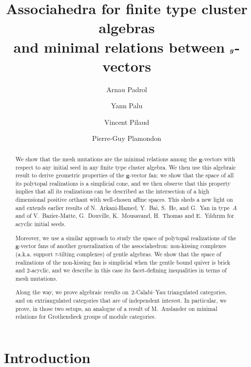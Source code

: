 \documentclass{amsart}
\title[Generalized associahedra and minimal relations between $\b{g}$-vectors]{Associahedra for finite type cluster algebras \\ and minimal relations between $\b{g}$-vectors}
\author{Arnau Padrol}
\author{Yann Palu}
\author{Vincent Pilaud}
\author{Pierre-Guy Plamondon}
\theoremstyle{definition}
\renewcommand{\b}[1]{{\boldsymbol{#1}}} %
\begin{document}
\begin{abstract}
We show that the mesh mutations are the minimal relations among the $\b{g}$-vectors with respect to any initial seed in any finite type cluster algebra.
We then use this algebraic result to derive geometric properties of the $\b{g}$-vector fan: we show that the space of all its polytopal realizations is a simplicial cone, and we then observe that this property implies that all its realizations can be described as the intersection of a high dimensional positive orthant with well-chosen affine spaces.
This sheds a new light on and extends earlier results of N.~Arkani-Hamed, Y.~Bai, S.~He, and G.~Yan in type~$A$ and of V.~Bazier-Matte, G.~Douville, K.~Mousavand, H.~Thomas and E.~Y\i ld\i r\i m for acyclic initial seeds.

Moreover, we use a similar approach to study the space of polytopal realizations of the \mbox{$\b{g}$-vector} fans of another generalization of the associahedron: non-kissing complexes (a.k.a. support $\tau$-tilting complexes) of gentle algebras. We show that the space of realizations of the non-kissing fan is simplicial when the gentle bound quiver is brick and $2$-acyclic, and we describe in this case its facet-defining inequalities in terms of mesh mutations.

Along the way, we prove algebraic results on~$2$-Calabi--Yau triangulated categories, and on extriangulated categories that are of independent interest.
In particular, we prove, in those two setups, an analogue of a result of M.~Auslander on minimal relations for Grothendieck groups of module categories.
\end{abstract}

\maketitle

%
\enlargethispage{.3cm}
\tableofcontents
\vspace{-.5cm}


\section*{Introduction}
\end{document}
